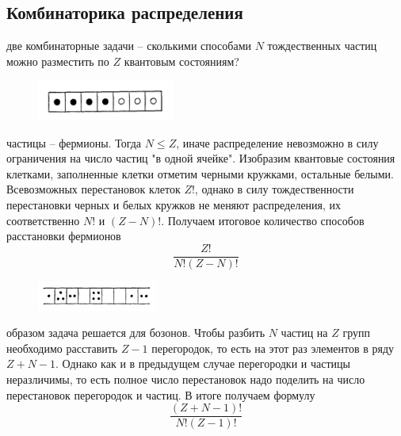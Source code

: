\documentclass[a4paper,12pt]{article}
\begin{document}
\subsection*{Комбинаторика распределения}
\par\indent{} две комбинаторные задачи -- сколькими способами $N$ тождественных частиц можно разместить по $Z$ квантовым состояниям?
\begin{figure}
  \begin{center}
    \includegraphics[width=0.4\textwidth]{ferm.png}
  \end{center}
\end{figure}
\par\indent{} частицы -- фермионы. Тогда $N\leq Z$, иначе распределение невозможно в силу ограничения на число частиц "в одной ячейке". Изобразим квантовые состояния клетками, заполненные клетки отметим черными кружками, остальные белыми. Всевозможных перестановок клеток $Z!$, однако в силу тождественности перестановки черных и белых кружков не меняют распределения, их соответственно $N!$ и $(Z-N)!$. Получаем итоговое количество способов расстановки фермионов
\[\frac{Z!}{N!(Z-N)!}\]
\begin{figure}
  \begin{center}
    \includegraphics[width=0.35\textwidth]{boz.png}
  \end{center}
\end{figure}
\par\indent{} образом задача решается для бозонов.
Чтобы разбить $N$ частиц на $Z$ групп необходимо расставить $Z-1$ перегородок, то есть на этот раз элементов в ряду $Z+N-1$. Однако как и в предыдущем случае перегородки и частицы неразличимы, то есть полное число перестановок надо поделить на число перестановок перегородок и частиц. В итоге получаем формулу
\[\frac{(Z+N-1)!}{N!(Z-1)!}\]




\newpage
\end{document}
